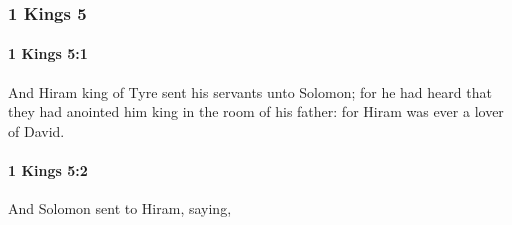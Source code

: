 	\subsubsection{1 Kings 5} %
		\label{1KINGS-5}

		\paragraph{1 Kings 5:1} %
			\label{1KINGS-5-1}

			And Hiram king of Tyre sent his servants unto Solomon; for he had heard that they had anointed him king in the room of his father: for Hiram was ever a lover of David.


		\paragraph{1 Kings 5:2} %
			\label{1KINGS-5-2}

			And Solomon sent to Hiram, saying,

